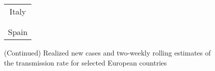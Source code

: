 \documentclass[12pt]{article}
\begin{document}
\begin{figure}[!p]%
\caption
{(Continued) Realized new cases and two-weekly rolling estimates of the transmission rate for selected European countries}%
\vspace{-0.3cm}%


\begin{center}%
\hspace*{-0.2cm}%
\begin{tabular}
[c]{cc}%
\multicolumn{2}{c}{{\footnotesize Italy}}\\%
{\includegraphics[
height=1.7763in,
width=3.5293in
]%
{figs/Italy_dcT.png}%
}
&
{\includegraphics[
height=1.7763in,
width=3.5293in
]%
{figs/Italy_TR_2W_cmp_MF.png}%
}
\\
& \\
\multicolumn{2}{c}{{\footnotesize Spain}}\\%

\end{tabular}
\end{center}
\end{figure}
\end{document}
